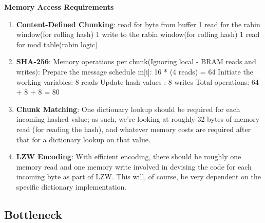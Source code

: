 \documentclass{article}
\begin{document}
\item%
\textbf{Memory Access Requirements}
\begin{enumerate}[label=(\roman*)]
\item%
\textbf{Content-Defined Chunking}: read for byte from buffer 1 read for the rabin window(for rolling hash) 1 write to the rabin window(for
rolling hash) 1 read for mod table(rabin logic)

\item%
\textbf{SHA-256}:\newline
Memory operations per chunk(Ignoring local - BRAM reads and writes): 
Prepare the message schedule m[i]: 16 * (4 reads) = 64 
Initiate the working variables: 8 reads  
Update hash values : 8 writes
Total operations: 64 + 8 + 8 = 80 

\item%
\textbf{Chunk Matching}:\newline
One dictionary lookup should be required for each incoming hashed value; as such, we're looking at roughly 32 bytes of memory read (for reading the hash), and whatever memory costs are required after that for a dictionary lookup on that value.

\item%
\textbf{LZW Encoding}:\newline
With efficient encoding, there should be roughly one memory read and one memory write involved in devising the code for each incoming byte as part of LZW. This will, of course, be very dependent on the specific dictionary implementation.

\end{enumerate}%

\subsection{Bottleneck}
\end{document}
